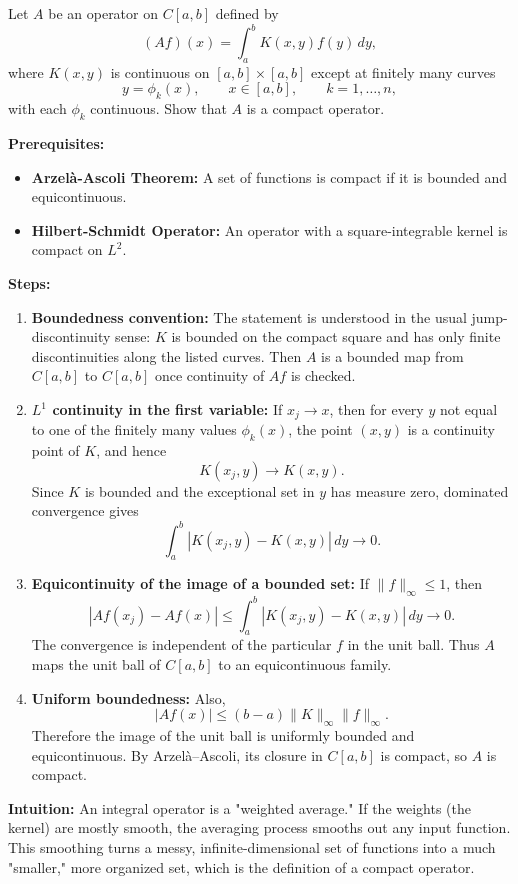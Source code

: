 \begin{exercise}
\label{analysis:2017:12}
Let $A$ be an operator on $C[a,b]$ defined by
\[
(Af)(x)=\int_a^b K(x,y)f(y)\,dy,
\]
where $K(x,y)$ is continuous on $[a,b]\times[a,b]$ except at finitely many curves
\[
y=\phi_k(x),\qquad x\in[a,b],\qquad k=1,\ldots,n,
\]
with each $\phi_k$ continuous. Show that $A$ is a compact operator.
\end{exercise}

\begin{solution}
\textbf{Prerequisites:}
\begin{itemize}
    \item \textbf{Arzelà-Ascoli Theorem:} A set of functions is compact if it is bounded and equicontinuous.
    \item \textbf{Hilbert-Schmidt Operator:} An operator with a square-integrable kernel is compact on $L^2$.
\end{itemize}

\textbf{Steps:}
\begin{enumerate}
    \item \textbf{Boundedness convention:} The statement is understood in the usual jump-discontinuity sense: $K$ is bounded on the compact square and has only finite discontinuities along the listed curves. Then $A$ is a bounded map from $C[a,b]$ to $C[a,b]$ once continuity of $Af$ is checked.
    \item \textbf{$L^1$ continuity in the first variable:} If $x_j\to x$, then for every $y$ not equal to one of the finitely many values $\phi_k(x)$, the point $(x,y)$ is a continuity point of $K$, and hence
    \[
    K(x_j,y)\to K(x,y).
    \]
    Since $K$ is bounded and the exceptional set in $y$ has measure zero, dominated convergence gives
    \[
    \int_a^b |K(x_j,y)-K(x,y)|\,dy\to0.
    \]
    \item \textbf{Equicontinuity of the image of a bounded set:} If $\|f\|_\infty\leq 1$, then
    \[
    |Af(x_j)-Af(x)|
    \leq \int_a^b |K(x_j,y)-K(x,y)|\,dy\to0.
    \]
    The convergence is independent of the particular $f$ in the unit ball. Thus $A$ maps the unit ball of $C[a,b]$ to an equicontinuous family.
    \item \textbf{Uniform boundedness:} Also,
    \[
    |Af(x)|\leq (b-a)\|K\|_\infty\|f\|_\infty.
    \]
    Therefore the image of the unit ball is uniformly bounded and equicontinuous. By Arzel\`a--Ascoli, its closure in $C[a,b]$ is compact, so $A$ is compact.
\end{enumerate}

\textbf{Intuition:}
An integral operator is a "weighted average." If the weights (the kernel) are mostly smooth, the averaging process smooths out any input function. This smoothing turns a messy, infinite-dimensional set of functions into a much "smaller," more organized set, which is the definition of a compact operator.
\end{solution}
